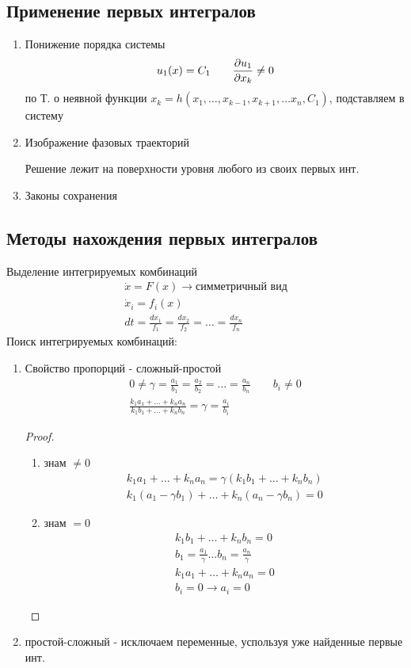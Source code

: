 \documentclass{article}
\begin{document}
\subsection{Применение первых интегралов}
\begin{enumerate}
  \item Понижение порядка системы
    \[
      u_1(x)=C_1 \qquad \frac{\partial{u_1}}{\partial{x_k}}\neq0
    \]
    по Т. о неявной функции $x_k=h(x_1, \dots, x_{k-1}, x_{k+1}, \dots x_n, C_1)$,
    подставляем в систему
  \item Изображение фазовых траекторий

    Решение лежит на поверхности уровня любого из своих первых инт.
  \item Законы сохранения
\end{enumerate}

\subsection{Методы нахождения первых интегралов}
Выделение интегрируемых комбинаций
\begin{gather*}
  \dot{x}=F(x) \rightarrow \text{симметричный вид} \\ 
  \dot{x}_i=f_i(x) \\ 
  dt=\frac{dx_1}{f_1}=\frac{dx_2}{f_2}=\dots =\frac{dx_n}{f_n}
\end{gather*}
Поиск интегрируемых комбинаций:
\begin{enumerate}
  \item Свойство пропорций - сложный-простой
    \begin{gather*}
      0\neq \gamma = \frac{a_1}{b_1}=\frac{a_2}{b_2}=\dots =\frac{a_n}{b_n} \qquad b_i\neq 0\\ 
      \frac{k_1a_1+\dots +k_na_n}{k_1b_1+\dots + k_nb_n}=\gamma=\frac{a_i}{b_i}
    \end{gather*}
    \hr
    \begin{proof}
      \phantom{.}

      \begin{enumerate}
        \item знам $\neq0$
          \begin{gather*}
            k_1a_1+\dots +k_na_n=\gamma(k_1b_1+\dots +k_nb_n) \\ 
            k_1(a_1-\gamma b_1) + \dots +k_n(a_n-\gamma b_n) = 0
          \end{gather*}
        \item знам $=0$
          \begin{gather*}
            k_1b_1+\dots +k_nb_n=0 \\ 
            b_1=\frac{a_1}{\gamma} \dots b_n=\frac{a_n}{\gamma} \\ 
            k_1a_1 + \dots + k_na_n = 0 \\ 
            b_i=0 \rightarrow a_i=0
          \end{gather*}
      \end{enumerate}
    \end{proof}
    \hr
  \item простой-сложный - исключаем переменные, успользуя уже найденные первые инт.
\end{enumerate}
\end{document}
